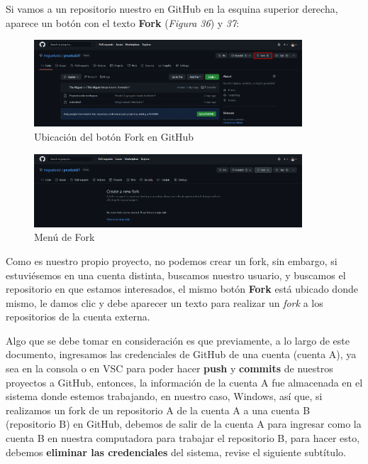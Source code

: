 Si vamos a un repositorio nuestro en GitHub en la esquina superior derecha, aparece un botón con el texto \textbf{Fork} (\textit{Figura 36}) y \textit{37}:
\begin{figure}[H]
    \begin{center}
        \caption{Ubicación del botón Fork en GitHub}
        \label{fig: 36}
        \includegraphics[width=10cm]{capturas/fork2.png}
    \end{center}
\end{figure}
\begin{figure}[H]
    \begin{center}
        \caption{Menú de Fork}
        \label{fig: 37}
        \includegraphics[width=10cm]{capturas/fork3.png}
    \end{center}
\end{figure}

Como es nuestro propio proyecto, no podemos crear un fork, sin embargo, si estuviésemos en una cuenta distinta, buscamos nuestro usuario, y buscamos el repositorio en que estamos interesados, el mismo botón \textbf{Fork} está ubicado donde mismo, le damos clic y debe aparecer un texto para realizar un \textit{fork} a los repositorios de la cuenta externa.

Algo que se debe tomar en consideración es que previamente, a lo largo de este documento, ingresamos las credenciales de GitHub de una cuenta (cuenta A), ya sea en la consola o en VSC para poder hacer \textbf{push} y \textbf{commits} de nuestros proyectos a GitHub, entonces, la información de la cuenta A fue almacenada en el sistema donde estemos trabajando, en nuestro caso, Windows, así que, si realizamos un fork de un repositorio A de la cuenta A a una cuenta B (repositorio B) en GitHub, debemos de salir de la cuenta A para ingresar como la cuenta B en nuestra computadora para trabajar el repositorio B, para hacer esto, debemos \textbf{eliminar las credenciales} del sistema, revise el siguiente subtítulo.



